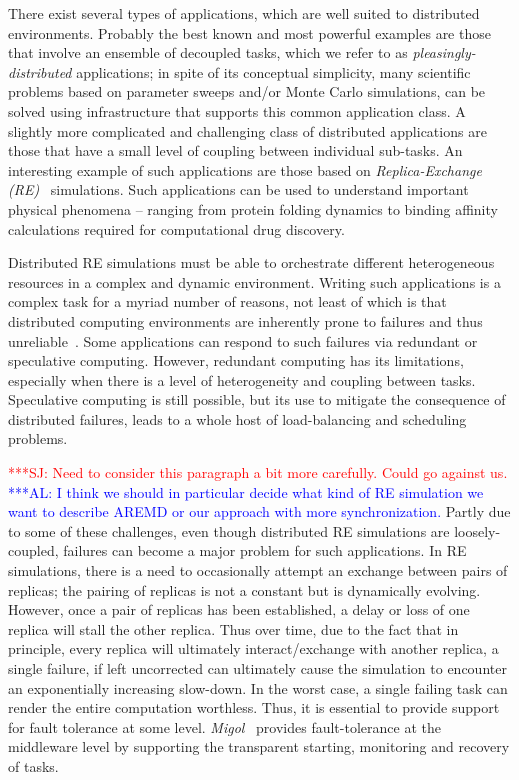 \documentclass{rspublic}
\newcommand{\alnote}[1]{ {\textcolor{blue} { ***AL: #1 }}}
\newcommand{\jhanote}[1]{ {\textcolor{red} { ***SJ: #1 }}}
\newcommand{\alnote}[1]{}
\newcommand{\jhanote}[1]{}
\begin{document}
There exist several types of applications, which are well suited
to distributed environments. Probably the best known and most powerful
examples are those that involve an ensemble of decoupled tasks, which
we refer to as {\it pleasingly-distributed} applications; in spite of
its conceptual simplicity, many scientific problems based on parameter
sweeps and/or Monte Carlo simulations, can be solved using
infrastructure that supports this common application class. A slightly
more complicated and challenging class of distributed applications are
those that have a small level of coupling between individual
sub-tasks.  An interesting example of such applications are those
based on \emph{Replica-Exchange (RE)}~\citep{hansmann,Sugita:1999rm}
simulations.  Such applications can be used to understand important
physical phenomena -- ranging from protein folding dynamics to binding
affinity calculations required for computational drug discovery.

Distributed RE simulations must be able to orchestrate different
heterogeneous resources in a complex and dynamic environment.  Writing
such applications is a complex task for a myriad number of reasons,
not least of which is that distributed computing environments are
inherently prone to failures and thus
unreliable~\citep{schroeder,10.1109/E-SCIENCE.2006.93,DBLP:conf/grid/KhaliliHOSC06}.
Some applications can respond to such failures via redundant or
speculative computing.  However, redundant computing has its
limitations, especially when there is a level of heterogeneity and
coupling between tasks.  Speculative computing is still possible, but
its use to mitigate the consequence of distributed failures, leads to
a whole host of load-balancing and scheduling problems.

\jhanote{Need to consider this paragraph a bit more carefully. Could
  go against us.} 
\alnote{I think we should in particular decide what kind of RE simulation we want to 
describe AREMD or our approach with more synchronization.}  
Partly due to some of these challenges, even though
distributed RE simulations are loosely-coupled, failures can become a
major problem for such applications.  In RE simulations, there is a
need to occasionally attempt an exchange between pairs of replicas;
the pairing of replicas is not a constant but is dynamically evolving.
However, once a pair of replicas has been established, a delay or loss
of one replica will stall the other replica.  Thus over time, due to
the fact that in principle, every replica will ultimately
interact/exchange with another replica, a single failure, if left
uncorrected can ultimately cause the simulation to encounter an
exponentially increasing slow-down.  In the worst case, a single
failing task can render the entire computation worthless.  Thus, it is
essential to provide support for fault tolerance at some level.
\emph{Migol}~\citep{schnorLuckow08} provides fault-tolerance at the
middleware level by supporting the transparent starting, monitoring
and recovery of tasks.
\end{document}
